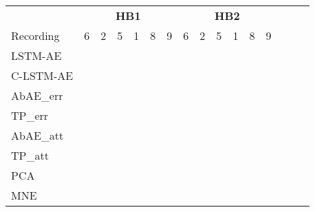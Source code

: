 \begin{table*}[btp]
\begin{sc}
\begin{subtable}[t]{\textwidth}
\begin{tabular}{lccccccccccccccc}
\toprule
          & \multicolumn{6}{c}{\textbf{HB1}} & \multicolumn{6}{c}{\textbf{HB2}} \\
\cmidrule(lr){2-7}\cmidrule(lr){8-13}
Recording & 6 &     2     & 5 & 1 & 8 & 9 &    6       &    2       &    5       & 1 & 8 & 9 \\
\cmidrule(lr){2-7}\cmidrule(lr){8-13}
LSTM-AE	&    &           &    &   &   &   &           &            &            &    &   &   \\
C-LSTM-AE&    &           &    &   &   &   &           &            &            &    &   &   \\
\midrule
AbAE\_err&    &           &    &   &   &   &           &            &            &    &   &   \\
TP\_err	&    &           &    &   &   &   &           &            &            &    &   &   \\
\midrule
AbAE\_att&    &           &    &   &   &   &           &            &            &    &   &   \\
TP\_att	&    &           &    &   &   &   &           &            &            &    &   &   \\
\midrule
PCA 	&    &           &    &   &   &   &           &            &            &    &   &   \\
MNE	&    &           &    &   &   &   &           &            &            &    &   &   \\
\bottomrule
\end{tabular}
\end{subtable}

\end{sc}
\end{table*}
